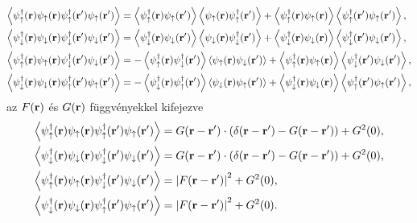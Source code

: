 \documentclass[a4paper,12pt,titlepage]{article}
\newcommand{\RR}{{\vb{r}}}
\begin{document}
\begin{equation}
\begin{split} \label{density-components}
	\left< \psi_\uparrow^\dagger(\RR) \psi_\uparrow(\RR) \psi_\uparrow^\dagger(\RR^\prime) \psi_\uparrow(\RR^\prime) \right> & = \left< \psi_\uparrow^\dagger(\RR) \psi_\uparrow(\RR^\prime) \right> \left< \psi_\uparrow(\RR) \psi_\uparrow^\dagger(\RR^\prime) \right> + \left< \psi_\uparrow^\dagger(\RR) \psi_\uparrow(\RR) \right> \left< \psi_\uparrow^\dagger(\RR^\prime) \psi_\uparrow(\RR^\prime) \right>,  \\
	\left< \psi_\downarrow^\dagger(\RR) \psi_\downarrow(\RR) \psi_\downarrow^\dagger(\RR^\prime) \psi_\downarrow(\RR^\prime) \right> & = \left< \psi_\downarrow^\dagger(\RR) \psi_\downarrow(\RR^\prime) \right> \left< \psi_\downarrow(\RR) \psi_\downarrow^\dagger(\RR^\prime) \right> + \left< \psi_\downarrow^\dagger(\RR) \psi_\downarrow(\RR) \right> \left< \psi_\downarrow^\dagger(\RR^\prime) \psi_\downarrow(\RR^\prime) \right>,  \\
	\left< \psi_\uparrow^\dagger(\RR) \psi_\uparrow(\RR) \psi_\downarrow^\dagger(\RR^\prime) \psi_\downarrow(\RR^\prime) \right> & = -\left< \psi_\uparrow^\dagger(\RR) \psi_\downarrow^\dagger(\RR^\prime) \right> \left< \psi_\uparrow(\RR) \psi_\downarrow(\RR^\prime) \right> + \left< \psi_\uparrow^\dagger(\RR) \psi_\uparrow(\RR) \right> \left< \psi_\downarrow^\dagger(\RR^\prime) \psi_\downarrow(\RR^\prime) \right>,  \\
	\left< \psi_\downarrow^\dagger(\RR) \psi_\downarrow(\RR) \psi_\uparrow^\dagger(\RR^\prime) \psi_\uparrow(\RR^\prime) \right> & = -\left< \psi_\downarrow^\dagger(\RR) \psi_\uparrow^\dagger(\RR^\prime) \right> \left< \psi_\downarrow(\RR) \psi_\uparrow(\RR^\prime) \right> + \left< \psi_\downarrow^\dagger(\RR) \psi_\downarrow(\RR) \right> \left< \psi_\uparrow^\dagger(\RR^\prime) \psi_\uparrow(\RR^\prime) \right>,
\end{split}
\end{equation}
az $F(\RR)$ és $G(\RR)$ függvényekkel kifejezve
\begin{equation} \label{correlators-F-G}
\begin{split}
	\left< \psi_\uparrow^\dagger(\RR) \psi_\uparrow(\RR) \psi_\uparrow^\dagger(\RR^\prime) \psi_\uparrow(\RR^\prime) \right> & = G(\RR - \RR^\prime) \cdot \left( \delta(\RR - \RR^\prime) - G(\RR - \RR^\prime) \right) + G^2(0), \\
	\left< \psi_\downarrow^\dagger(\RR) \psi_\downarrow(\RR) \psi_\downarrow^\dagger(\RR^\prime) \psi_\downarrow(\RR^\prime) \right> & = G(\RR - \RR^\prime) \cdot \left( \delta(\RR - \RR^\prime) - G(\RR - \RR^\prime) \right) + G^2(0), \\
	\left< \psi_\uparrow^\dagger(\RR) \psi_\uparrow(\RR) \psi_\downarrow^\dagger(\RR^\prime) \psi_\downarrow(\RR^\prime) \right> & = \left| F(\RR - \RR^\prime) \right|^2 + G^2(0), \\
	\left< \psi_\downarrow^\dagger(\RR) \psi_\downarrow(\RR) \psi_\uparrow^\dagger(\RR^\prime) \psi_\uparrow(\RR^\prime) \right> & = \left| F(\RR - \RR^\prime) \right|^2 + G^2(0).
\end{split}
\end{equation}
\end{document}
